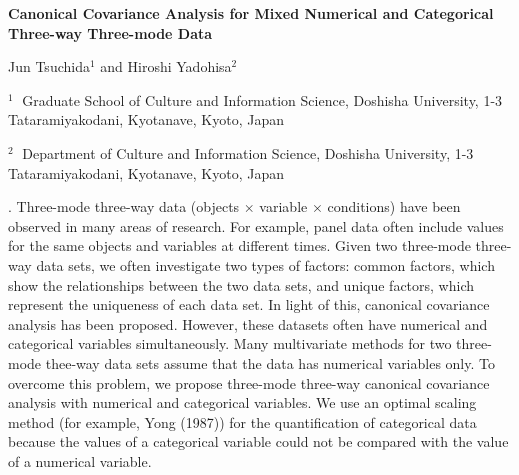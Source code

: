 \documentclass[12pt]{article}
\begin{document}
\begin{flushleft}


{\LARGE\bf Canonical Covariance Analysis for Mixed Numerical and Categorical Three-way Three-mode Data}


\vspace{1.0cm}

Jun Tsuchida$^1$ and Hiroshi Yadohisa$^2$

\begin{description}

\item $^1 \;$ Graduate School of Culture and Information Science, Doshisha University,
1-3 Tataramiyakodani, Kyotanave, Kyoto, Japan

\item $^2 \;$ Department of Culture and Information Science, Doshisha University,
1-3 Tataramiyakodani, Kyotanave, Kyoto, Japan

\end{description}

\end{flushleft}


\vspace{0.75cm}

.
Three-mode three-way data (objects $\times$ variable $\times$ conditions) have been observed in many areas of research. For example, panel data often include values
for the same objects and variables at different times. 
Given two three-mode three-way data
sets, we often investigate two types of factors: common factors, which show the
relationships between the two data sets, and unique factors, which represent
the uniqueness of each data set. In light of this, canonical covariance analysis has been proposed. However, these datasets often have numerical and categorical variables simultaneously. Many multivariate methods for two three-mode thee-way data sets assume that the data has numerical variables only. To overcome this problem,
we propose three-mode three-way canonical covariance analysis with numerical and categorical variables. We use an optimal scaling method (for example, Yong (1987)) for the quantification of categorical data because the values of a categorical variable could not be compared with the value of a numerical variable.

\end{document}
